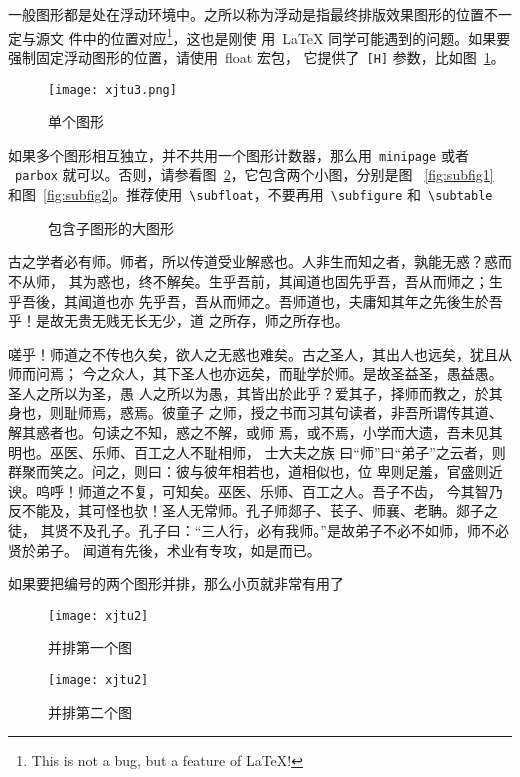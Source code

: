 \documentclass[%
               amsthm,
              ]{xjtubsc}
\begin{document}
一般图形都是处在浮动环境中。之所以称为浮动是指最终排版效果图形的位置不一定与源文
件中的位置对应\footnote{This is not a bug, but a feature of \LaTeX!}，这也是刚使
用~\LaTeX{} 同学可能遇到的问题。如果要强制固定浮动图形的位置，请使用~\textsf{float} 宏包，
它提供了~\texttt{[H]} 参数，比如图~\ref{fig:xfig1}。
\begin{figure}[H] 
  \centering
  \texttt{[image: xjtu3.png]}
  \caption{单个图形}
  \label{fig:xfig1}
\end{figure}
如果多个图形相互独立，并不共用一个图形计数器，那么用~\verb|minipage| 或者
~\verb|parbox| 就可以。否则，请参看图~\ref{fig:big1}，它包含两个小图，分别是图
~\ref{fig:subfig1} 和图~\ref{fig:subfig2}。推荐使用~\verb|\subfloat|，不要再用~\verb|\subfigure|
和~\verb|\subtable|
\begin{figure}[h]
  \centering%
  \hspace{4em}%
  \caption{包含子图形的大图形}
  \label{fig:big1}
\end{figure}

古之学者必有师。师者，所以传道受业解惑也。人非生而知之者，孰能无惑？惑而不从师，
其为惑也，终不解矣。生乎吾前，其闻道也固先乎吾，吾从而师之；生乎吾後，其闻道也亦
先乎吾，吾从而师之。吾师道也，夫庸知其年之先後生於吾乎！是故无贵无贱无长无少，道
之所存，师之所存也。

嗟乎！师道之不传也久矣，欲人之无惑也难矣。古之圣人，其出人也远矣，犹且从师而问焉；
今之众人，其下圣人也亦远矣，而耻学於师。是故圣益圣，愚益愚。圣人之所以为圣，愚
人之所以为愚，其皆出於此乎？爱其子，择师而教之，於其身也，则耻师焉，惑焉。彼童子
之师，授之书而习其句读者，非吾所谓传其道、解其惑者也。句读之不知，惑之不解，或师
焉，或不焉，小学而大遗，吾未见其明也。巫医、乐师、百工之人不耻相师，  士大夫之族
曰“师”曰“弟子”之云者，则群聚而笑之。问之，则曰：彼与彼年相若也，道相似也，位
卑则足羞，官盛则近谀。呜呼！师道之不复，可知矣。巫医、乐师、百工之人。吾子不齿，
今其智乃反不能及，其可怪也欤！圣人无常师。孔子师郯子、苌子、师襄、老聃。郯子之徒，
其贤不及孔子。孔子曰：“三人行，必有我师。”是故弟子不必不如师，师不必贤於弟子。
闻道有先後，术业有专攻，如是而已。

如果要把编号的两个图形并排，那么小页就非常有用了
\begin{figure}[h]
\begin{minipage}{0.48\textwidth}
  \centering
  \texttt{[image: xjtu2]}
  \caption{并排第一个图}
  \label{fig:parallel1}
\end{minipage}\hfill
\begin{minipage}{0.48\textwidth}
  \centering
  \texttt{[image: xjtu2]}
  \caption{并排第二个图}
  \label{fig:parallel2}
\end{minipage}
\end{figure}
\end{document}
